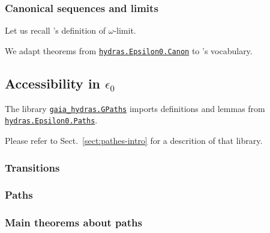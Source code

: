 



\subsubsection{Canonical sequences and limits}


Let us recall \gaia's definition of $\omega$-limit.


We adapt theorems from \href{../theories/html/hydras.Epsilon0.Canon.html}%
{\texttt{hydras.Epsilon0.Canon}} to \gaia's vocabulary.


\subsection{Accessibility in \texorpdfstring{$\epsilon_0$}{epsilon\_0}}

The library \href{../theories/html/gaia_hydras.GPaths.html}%
{\texttt{gaia\_hydras.GPaths}} imports definitions and lemmas from
\href{../theories/html/hydras.Epsilon0.Paths.html}%
{\texttt{hydras.Epsilon0.Paths}}.

Please refer to Sect.~\ref{sect:pathes-intro} for a descrition of that library.


\subsubsection{Transitions}
  

\subsubsection{Paths}


\subsubsection{Main theorems about paths}

